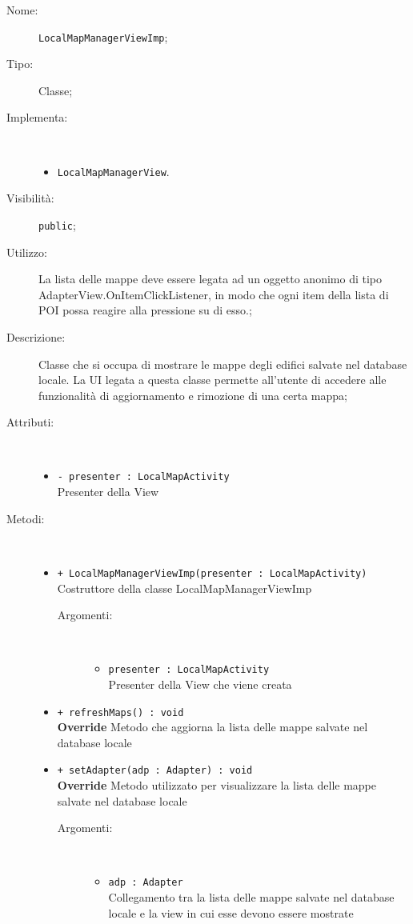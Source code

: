 \documentclass[../DefinizioneDiProdotto.tex]{subfiles}
\begin{document}
\begin{description}
	\item[Nome:] \texttt{LocalMapManagerViewImp};
	\item[Tipo:] Classe;
	\item[Implementa:] \
	\begin{itemize}
		\item \texttt{LocalMapManagerView}.
		
	\end{itemize}
	\item[Visibilità:] \texttt{public};
	\item[Utilizzo:] La lista delle mappe deve essere legata ad un oggetto anonimo di tipo AdapterView.OnItemClickListener, in modo che ogni item della lista di POI possa reagire alla pressione su di esso.;
	\item[Descrizione:] Classe che si occupa di mostrare le mappe degli edifici salvate nel database locale. La UI legata a questa classe permette all'utente di accedere alle funzionalità di aggiornamento e rimozione di una certa mappa;
	\item[Attributi:] \
	\begin{itemize}
		\item \texttt{- presenter : LocalMapActivity}\\
		Presenter della View
		
	\end{itemize}
	\item[Metodi:] \
	\begin{itemize}
		\item \texttt{+ LocalMapManagerViewImp(presenter : LocalMapActivity)}\\
		Costruttore della classe LocalMapManagerViewImp
		\begin{description}
			\item[Argomenti:] \
			\begin{itemize}
				\item \texttt{presenter : LocalMapActivity}\\
				Presenter della View che viene creata\end{itemize}
		\end{description}
		\item \texttt{+ refreshMaps() : void}\\
		\textbf{Override} Metodo che aggiorna la lista delle mappe salvate nel database locale
		\item \texttt{+ setAdapter(adp : Adapter) : void}\\
		\textbf{Override} Metodo utilizzato per visualizzare la lista delle mappe salvate nel database locale
		\begin{description}
			\item[Argomenti:] \
			\begin{itemize}
				\item \texttt{adp : Adapter}\\
				Collegamento tra la lista delle mappe salvate nel database locale e la view in cui esse devono essere mostrate\end{itemize}
		\end{description}
	\end{itemize}
\end{description}
\end{document}
